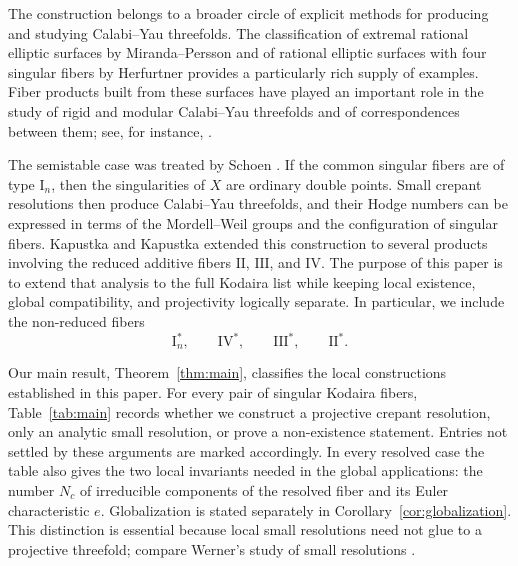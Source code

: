 \documentclass[a4paper]{amsart}
\theoremstyle{plain}
\theoremstyle{definition}
\theoremstyle{remark}
\numberwithin{equation}{section}
\begin{document}
The construction belongs to a broader circle of explicit methods for
producing and studying Calabi--Yau threefolds.  The classification of
extremal rational elliptic surfaces by Miranda--Persson
\cite{MirandaPersson} and of rational elliptic surfaces with four singular
fibers by Herfurtner \cite{Herfurtner} provides a particularly rich supply
of examples.  Fiber products built from these surfaces have played an
important role in the study of rigid and modular Calabi--Yau threefolds and
of correspondences between them; see, for instance,
\cite{Schuett,KapustkaKum}.

The semistable case was treated by Schoen \cite{Schoen}.  If the common
singular fibers are of type \(\mathrm{I}_n\), then the singularities
of \(X\) are ordinary double points.  Small crepant resolutions then produce
Calabi--Yau threefolds, and their Hodge numbers can be expressed in terms of
the Mordell--Weil groups and the configuration of singular fibers.  Kapustka
and Kapustka \cite{KK} extended this construction to several products
involving the reduced additive fibers
\(\mathrm{II}\), \(\mathrm{III}\), and
\(\mathrm{IV}\).  The purpose of this paper is to extend that
analysis to the full Kodaira list while keeping local existence, global
compatibility, and projectivity logically separate.  In particular, we include the
non-reduced fibers
\[
\mathrm{I}_n^*,\qquad
        \mathrm{IV}^*,\qquad
        \mathrm{III}^*,\qquad
        \mathrm{II}^* .
\]

Our main result, Theorem~\ref{thm:main}, classifies the local constructions
established in this paper.  For every pair of singular Kodaira fibers,
Table~\ref{tab:main} records whether we construct a projective crepant
resolution, only an analytic small resolution, or prove a non-existence
statement.  Entries not settled by these arguments are marked accordingly.
In every resolved case the table also gives the two local invariants needed
in the global applications: the number \(N_c\) of irreducible components of
the resolved fiber and its Euler characteristic \(e\).  Globalization is
stated separately in Corollary~\ref{cor:globalization}.  This distinction is
essential because local small resolutions need not glue to a projective
threefold; compare Werner's study of small resolutions \cite{Werner}.
\end{document}
